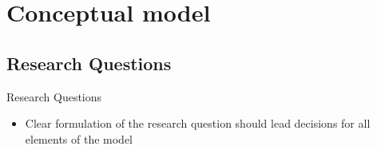 \documentclass[final,xcolor=dvipsnames]{beamer}
\begin{document}
      \section{Conceptual model}
      \subsection{Research Questions}
      
      \begin{frame}
	\begin{block}{Research Questions}
	  \begin{itemize}
	    \item Clear formulation of the research question should lead decisions for all elements of the model 
	  \end{itemize}
	\end{block}
      \end{frame}
      
\end{document}
